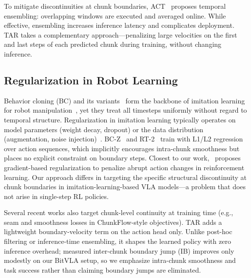 To mitigate discontinuities at chunk boundaries, ACT~\cite{zhao2023act} proposes temporal ensembling: overlapping windows are executed and averaged online. While effective, ensembling increases inference latency and complicates deployment. TAR takes a complementary approach---penalizing large velocities on the first and last steps of each predicted chunk during training, without changing inference.

\subsection{Regularization in Robot Learning}
Behavior cloning (BC) and its variants~\cite{ross2011reduction} form the backbone of imitation learning for robot manipulation~\cite{mandlekar2021matters}, yet they treat all timesteps uniformly without regard to temporal structure. Regularization in imitation learning typically operates on model parameters (weight decay, dropout) or the data distribution (augmentation, noise injection)~\cite{kim2025openvlaoft,wang2025bitvla}. BC-Z~\cite{jang2022bcz} and RT-2~\cite{brohan2023rt2} train with L1/L2 regression over action sequences, which implicitly encourages intra-chunk smoothness but places no explicit constraint on boundary steps. Closest to our work,~\cite{marino2024gradient} proposes gradient-based regularization to penalize abrupt action changes in reinforcement learning. Our approach differs in targeting the specific structural discontinuity at chunk boundaries in imitation-learning-based VLA models---a problem that does not arise in single-step RL policies.

Several recent works also target chunk-level continuity at training time (e.g., seam and smoothness losses in ChunkFlow-style objectives). TAR adds a lightweight boundary-velocity term on the action head only. Unlike post-hoc filtering or inference-time ensembling, it shapes the learned policy with zero inference overhead; measured inter-chunk boundary jump (IB) improves only modestly on our BitVLA setup, so we emphasize intra-chunk smoothness and task success rather than claiming boundary jumps are eliminated.
